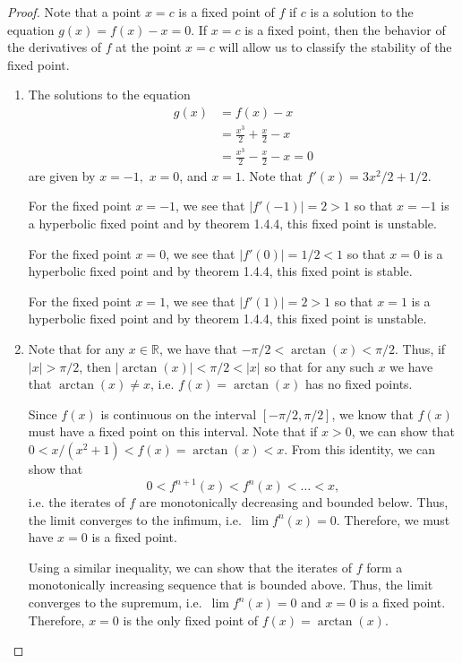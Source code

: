 \begin{proof}
  Note that a point $x=c$ is a fixed point of $f$ if $c$ is a solution to the equation $g(x) = f(x) - x = 0$.
  If $x=c$ is a fixed point, then the behavior of the derivatives of $f$ at the point $x=c$ will allow us
  to classify the stability of the fixed point.

  \begin{enumerate}
    \item The solutions to the equation
      \begin{align*}
        g(x) &= f(x) - x \\
        &= \frac{x^3}{2} + \frac{x}{2} - x \\
        &= \frac{x^3}{2} - \frac{x}{2} - x = 0
      \end{align*}
      are given by $x = -1,$ $x = 0$, and $x = 1$. Note that $f'(x) = 3x^2/{2} + 1/2$.

      For the fixed point $x=-1$, we see that $|f'(-1)| = 2 > 1$ so that $x=-1$ is a hyperbolic fixed point
      and by theorem 1.4.4, this fixed point is unstable.

      For the fixed point $x=0$, we see that $|f'(0)| = 1/2 < 1$ so that $x=0$ is a hyperbolic fixed point
      and by theorem 1.4.4, this fixed point is stable.

      For the fixed point $x=1$, we see that $|f'(1)| = 2 > 1$ so that $x=1$ is a hyperbolic fixed point
      and by theorem 1.4.4, this fixed point is unstable.

    \item Note that for any $x\in\mathbb{R}$, we have that $-\pi/2 < \arctan(x) < \pi/2$.
      Thus, if $|x| > \pi/2$, then $|\arctan(x)| < \pi/2 < |x|$ so that for any such $x$ we have
      that $\arctan(x) \neq x$, i.e. $f(x) = \arctan(x)$ has no fixed points.

      Since $f(x)$ is continuous
      on the interval $[-\pi/2, \pi/2]$, we know that $f(x)$ must have a fixed point on this interval.
      Note that if $x > 0$, we can show that $0 < x/(x^2+1) < f(x) = \arctan(x) < x$. From this identity, we can show that
      $$0 < f^{n+1}(x) < f^{n}(x) < \dots < x,$$ i.e. the iterates of $f$
      are monotonically decreasing and bounded below. Thus, the limit converges to the infimum, i.e.\
      $\lim f^n(x) = 0$. Therefore, we must have $x=0$ is a fixed point.

      Using a similar inequality, we can show that the iterates of $f$ form a monotonically increasing sequence that is bounded above.
      Thus, the limit converges to the supremum, i.e.\ $\lim f^n(x) = 0$ and $x =0$ is a fixed point. Therefore, $x=0$ is the only fixed point of $f(x) = \arctan(x)$.


\end{enumerate}
\end{proof}

